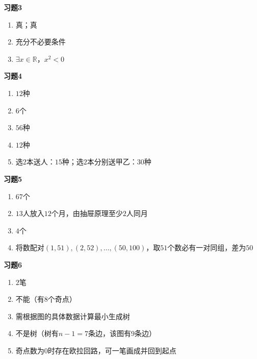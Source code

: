 \documentclass[a4paper,12pt]{ctexart}
\begin{document}
\textbf{习题3}
\begin{enumerate}
\item 真；真
\item 充分不必要条件
\item $\exists x\in\mathbb R$，$x^2<0$
\end{enumerate}

\textbf{习题4}
\begin{enumerate}
\item $12$种
\item $6$个
\item $56$种
\item $12$种
\item 选$2$本送人：$15$种；选$2$本分别送甲乙：$30$种
\end{enumerate}

\textbf{习题5}
\begin{enumerate}
\item $67$个
\item $13$人放入$12$个月，由抽屉原理至少$2$人同月
\item $4$个
\item 将数配对$(1,51),(2,52),\dots,(50,100)$，取$51$个数必有一对同组，差为$50$
\end{enumerate}

\textbf{习题6}
\begin{enumerate}
\item $2$笔
\item 不能（有$8$个奇点）
\item 需根据图的具体数据计算最小生成树
\item 不是树（树有$n-1=7$条边，该图有$9$条边）
\item 奇点数为$0$时存在欧拉回路，可一笔画成并回到起点
\end{enumerate}
\end{document}
